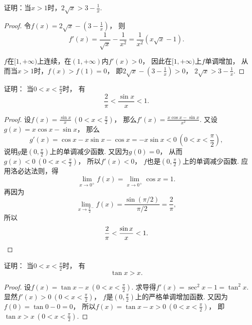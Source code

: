 \begin{example}
证明：当\(x > 1\)时，\(2 \sqrt{x} > 3 - \frac{1}{x}\).
\begin{proof}
令\(f(x) = 2 \sqrt{x} - \left(3 - \frac{1}{x}\right)\)，
则\begin{equation*}
	f'(x) = \frac{1}{\sqrt{x}} - \frac{1}{x^2}
	= \frac{1}{x^2} (x \sqrt{x} - 1).
\end{equation*}

\(f\)在\([1,+\infty)\)上连续，在\((1,+\infty)\)内\(f'(x) > 0\)，
因此在\([1,+\infty)\)上\(f\)单调增加，
从而当\(x > 1\)时，\(f(x) > f(1) = 0\)，
即\(2 \sqrt{x} - \left(3 - \frac{1}{x}\right) > 0\)，
\(2 \sqrt{x} > 3 - \frac{1}{x}\).
\end{proof}
\end{example}

\begin{example}
证明：
当\(0<x<\frac\pi2\)时，
有\begin{equation}\label{equation:微分中值定理.若尔当不等式}
	\frac2\pi < \frac{\sin x}{x} < 1.
\end{equation}
\begin{proof}
设\(f(x) = \frac{\sin x}{x}\ (0<x<\frac\pi2)\)，
那么\(f'(x) = \frac{x \cos x - \sin x}{x^2}\).
又设\(g(x) = x \cos x - \sin x\)，
那么\begin{equation*}
	g'(x) = \cos x - x \sin x - \cos x = -x \sin x < 0\ (0<x<\frac\pi2),
\end{equation*}
说明\(g\)是\((0,\frac\pi2)\)上的单调减少函数.
又因为\(g(0) = 0\)，
从而\(g(x) < 0\ (0<x<\frac\pi2)\)，
所以\(f'(x) < 0\)，
\(f\)也是\((0,\frac\pi2)\)上的单调减少函数.
应用洛必达法则，得\begin{equation*}
	\lim_{x\to0^+} f(x)
	= \lim_{x\to0^+} \cos x
	= 1.
\end{equation*}
再因为\begin{equation*}
	\lim_{x\to\frac\pi2^-} f(x)
	= \frac{\sin(\pi/2)}{\pi/2}
	= \frac2\pi,
\end{equation*}
所以\begin{equation*}
	\frac2\pi < \frac{\sin x}{x} < 1.
	\qedhere
\end{equation*}
\end{proof}
\end{example}

\begin{example}
证明：
当\(0<x<\frac\pi2\)时，
有\begin{equation}\label{equation:单调性.正切不等式}
	\tan x > x.
\end{equation}
\begin{proof}
设\(f(x) = \tan x - x\ (0<x<\frac\pi2)\).
求导得\(f'(x) = \sec^2 x - 1 = \tan^2 x\).
显然\(f'(x) > 0\ (0<x<\frac\pi2)\)，
\(f\)是\((0,\frac\pi2)\)上的严格单调增加函数.
又因为\(f(0) = \tan0 - 0 = 0\)，
所以\(f(x) = \tan x - x > 0\ (0<x<\frac\pi2)\)，
即\(\tan x > x\ (0<x<\frac\pi2)\).
\end{proof}
\end{example}

